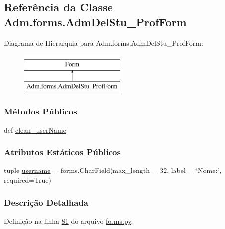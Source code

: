 \hypertarget{classAdm_1_1forms_1_1AdmDelStu__ProfForm}{\subsection{Referência da Classe Adm.\-forms.\-Adm\-Del\-Stu\-\_\-\-Prof\-Form}
\label{classAdm_1_1forms_1_1AdmDelStu__ProfForm}
}
Diagrama de Hierarquia para Adm.\-forms.\-Adm\-Del\-Stu\-\_\-\-Prof\-Form\-:\begin{figure}[H]
\begin{center}
\leavevmode
\includegraphics[height=2.000000cm]{d1/d26/classAdm_1_1forms_1_1AdmDelStu__ProfForm}
\end{center}
\end{figure}
\subsubsection*{Métodos Públicos}
\begin{DoxyCompactItemize}
\item 
def \hyperlink{classAdm_1_1forms_1_1AdmDelStu__ProfForm_af247df629a728f32b413307930dc2748}{clean\-\_\-user\-Name}
\end{DoxyCompactItemize}
\subsubsection*{Atributos Estáticos Públicos}
\begin{DoxyCompactItemize}
\item 
tuple \hyperlink{classAdm_1_1forms_1_1AdmDelStu__ProfForm_a780eaf9b2d36cd160f6e574fe9023452}{username} = forms.\-Char\-Field(max\-\_\-length = 32, label = \char`\"{}Nome\-:\char`\"{}, required=True)
\end{DoxyCompactItemize}


\subsubsection{Descrição Detalhada}


Definição na linha \hyperlink{Adm_2forms_8py_source_l00081}{81} do arquivo \hyperlink{Adm_2forms_8py_source}{forms.\-py}.



